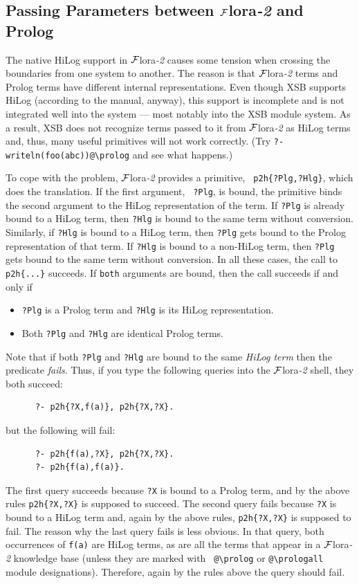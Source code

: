\documentclass[11pt]{article}
\newcommand{\FLORA}{{\mbox{\sc ${\cal F}${lora}\rm\emph{-2}}}\xspace}
\newcommand{\FLSYSTEM}{\FLORA}
\newcommand{\bs}{\textbackslash}
\begin{document}


\subsection{Passing Parameters between \FLSYSTEM and Prolog}\label{sec-passing-args}

The native HiLog support in \FLSYSTEM causes some tension when crossing the
boundaries from one system to another. The reason is that \FLSYSTEM terms and Prolog
terms have different internal representations. Even though XSB supports
HiLog (according to the manual, anyway), this support is incomplete and is
not integrated well into the system --- most notably into the XSB module
system. As a result, XSB does not recognize terms passed to it from \FLSYSTEM
as HiLog terms and, thus, many useful primitives will not work correctly.
(Try {\tt ?- writeln(foo(abc))@\bs{}prolog} and see what happens.)

To cope with the problem, \FLSYSTEM provides a primitive, {\tt
  p2h\{?Plg,?Hlg\}}, which does the translation. If the first argument, {\tt
  ?Plg}, is bound, the primitive binds the second argument to the HiLog
representation of the term. If {\tt ?Plg} is already bound to a HiLog term,
then {\tt ?Hlg} is bound to the same term without conversion.  Similarly, if
{\tt ?Hlg} is bound to a HiLog term, then {\tt ?Plg} gets bound to the Prolog
representation of that term. If {\tt ?Hlg} is bound to a non-HiLog term,
then {\tt ?Plg} gets bound to the same term without conversion. In all these
cases, the call to {\tt p2h\{...\}} succeeds. If {\tt both} arguments are
bound, then the call succeeds if and only if
\begin{itemize}
\item {\tt ?Plg} is a Prolog term and {\tt ?Hlg} is its HiLog
  representation.
\item Both {\tt ?Plg} and {\tt ?Hlg} are identical Prolog terms.
\end{itemize}
Note that if both {\tt ?Plg} and {\tt ?Hlg} are bound to the same
\emph{HiLog term} then the predicate \emph{fails}. Thus, if you type the
following queries into the \FLSYSTEM shell, they both succeed:
\begin{verbatim}
      ?- p2h{?X,f(a)}, p2h{?X,?X}.
\end{verbatim}
but the following will fail:
\begin{verbatim}
      ?- p2h{f(a),?X}, p2h{?X,?X}.
      ?- p2h{f(a),f(a)}.
\end{verbatim}
The first query succeeds because {\tt ?X}  is bound to a Prolog term, and by the
above rules {\tt p2h\{?X,?X\}} is supposed to succeed. The second query fails
because {\tt ?X} is bound to a HiLog term and, again by the above rules,
{\tt p2h\{?X,?X\}} is supposed to fail.
The reason why the last query fails is less obvious.
In that query, both occurrences of {\tt f(a)} are HiLog terms, as are all the
terms that appear in a \FLSYSTEM knowledge base (unless they are marked with {\tt
  @\bs{}prolog} or {\tt @\bs{}prologall} module designations). Therefore, again by
the rules above the query should fail.
\end{document}
